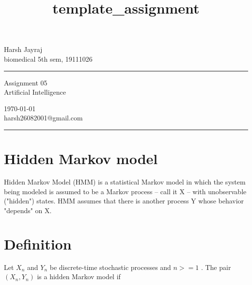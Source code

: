 \documentclass[a4paper,10pt]{article} %
\begin{document}

\title{template_assignment} %
\fancyhead[C]{}
\begin{minipage}{0.295\textwidth} %
\raggedright
Harsh Jayraj\\ %
\footnotesize %
biomedical 5th sem, 19111026 %
\medskip\hrule
\end{minipage}
\begin{minipage}{0.4\textwidth} %
\centering 
\large %
Assignment 05\\ %
\normalsize %
Artificial Intelligence\\ %
\end{minipage}
\begin{minipage}{0.295\textwidth} %
\raggedleft
\today\\ %
\footnotesize %
harsh26082001@gmail.com%
\medskip\hrule
\end{minipage}


\section{\color{brown}Hidden Markov model}
Hidden Markov Model (HMM) is a statistical Markov model in which the system being modeled is assumed to be a Markov process – call it X – with unobservable ("hidden") states. HMM assumes that there is another process Y whose behavior "depends" on X.

\section{Definition}
Let $X_n$ and $Y_n$ be discrete-time stochastic processes and $n>=1$ . The pair $(X_n,Y_n)$ is a hidden Markov model if
\end{document}
